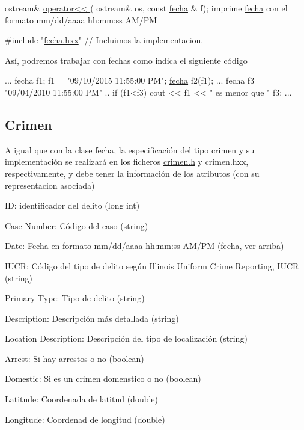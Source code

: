 \begin{DoxyCode}
 ostream& \hyperlink{fecha_8h_a9787de38b43ae62ba2c0812f3dd18394}{operator<< }( ostream& os, \textcolor{keyword}{const} \hyperlink{classfecha}{fecha} & f); imprime 
      \hyperlink{classfecha}{fecha} con el formato  mm/dd/aaaa hh:mm:ss AM/PM

\textcolor{preprocessor}{#include "\hyperlink{fecha_8hxx}{fecha.hxx}"} \textcolor{comment}{// Incluimos la implementacion.}
\end{DoxyCode}


Así, podremos trabajar con fechas como indica el siguiente código 
\begin{DoxyCode}
...
fecha f1;
f1 = \textcolor{stringliteral}{"09/10/2015 11:55:00 PM"};
\hyperlink{classfecha}{fecha} f2(f1);
...
fecha f3 = \textcolor{stringliteral}{"09/04/2010 11:55:00 PM"}
..
\textcolor{keywordflow}{if} (f1<f3) 
  cout << f1 << \textcolor{stringliteral}{" es menor que "} f3;
...
\end{DoxyCode}
\hypertarget{index_crime}{}\subsection{Crimen}\label{index_crime}
A igual que con la clase fecha, la especificación del tipo crimen y su implementación se realizará en los ficheros \hyperlink{crimen_8h}{crimen.\+h} y crimen.\+hxx, respectivamente, y debe tener la información de los atributos (con su representacion asociada)

\begin{DoxyItemize}
\item I\+D\+: identificador del delito (long int) \item Case Number\+: Código del caso (string) \item Date\+: Fecha en formato mm/dd/aaaa hh\+:mm\+:ss A\+M/\+P\+M (fecha, ver arriba) \item I\+U\+C\+R\+: Código del tipo de delito según Illinois Uniform Crime Reporting, I\+U\+C\+R (string) \item Primary Type\+: Tipo de delito (string) \item Description\+: Descripción más detallada (string) \item Location Description\+: Descripción del tipo de localización (string) \item Arrest\+: Si hay arrestos o no (boolean) \item Domestic\+: Si es un crimen domenstico o no (boolean) \item Latitude\+: Coordenada de latitud (double) \item Longitude\+: Coordenad de longitud (double)\end{DoxyItemize}

